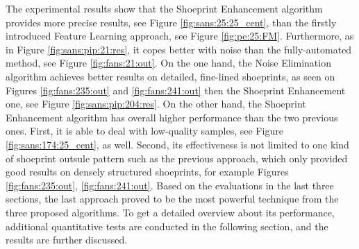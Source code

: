 \documentclass[draft,final]{vutinfth} %
\begin{document}

\par
The experimental results show that the Shoeprint Enhancement algorithm provides more precise results, see Figure \ref{fig:sans:25:25_cent}, than the firstly introduced Feature Learning approach, see Figure \ref{fig:pe:25:FM}.
Furthermore, as in Figure \ref{fig:sans:pip:21:res}, it copes better with noise than the fully-automated method, see Figure \ref{fig:fans:21:out}.
On the one hand, the Noise Elimination algorithm achieves better results on detailed, fine-lined shoeprints, as seen on Figures \ref{fig:fans:235:out} and \ref{fig:fans:241:out} then the Shoeprint Enhancement one, see Figure \ref{fig:sans:pip:204:res}.
On the other hand, the Shoeprint Enhancement algorithm has overall higher performance than the two previous ones.
First, it is able to deal with low-quality samples, see Figure \ref{fig:sans:174:25_cent}, as well.
Second, its effectiveness is not limited to one kind of shoeprint outsule pattern such as the previous approach, which only provided good results on densely structured shoeprints, for example Figures \ref{fig:fans:235:out}, \ref{fig:fans:241:out}. 
Based on the evaluations in the last three sections, the last approach proved to be the most powerful technique from the three proposed algorithms.
To get a detailed overview about its performance, additional quantitative tests are conducted in the following section, and the results are further discussed.
\end{document}
